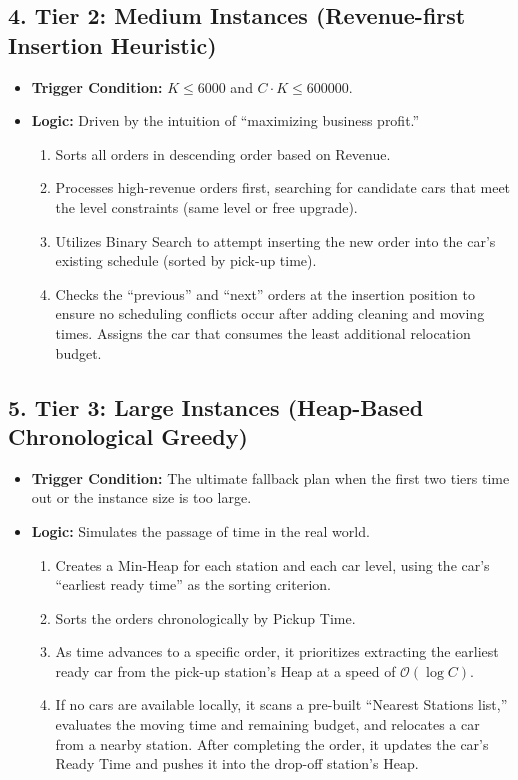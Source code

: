 \documentclass[12pt,a4paper]{article}
\begin{document}
\subsection*{4. Tier 2: Medium Instances (Revenue-first Insertion Heuristic)}
\begin{itemize}
    \item \textbf{Trigger Condition:} $K \le 6000$ and $C \cdot K \le 600000$.
    \item \textbf{Logic:} Driven by the intuition of ``maximizing business profit.''
    \begin{enumerate}[label=\textbf{\alph*.}]
        \item Sorts all orders in descending order based on Revenue.
        \item Processes high-revenue orders first, searching for candidate cars that meet the level constraints (same level or free upgrade).
        \item Utilizes Binary Search to attempt inserting the new order into the car's existing schedule (sorted by pick-up time).
        \item Checks the ``previous'' and ``next'' orders at the insertion position to ensure no scheduling conflicts occur after adding cleaning and moving times. Assigns the car that consumes the least additional relocation budget.
    \end{enumerate}
\end{itemize}

\subsection*{5. Tier 3: Large Instances (Heap-Based Chronological Greedy)}
\begin{itemize}
    \item \textbf{Trigger Condition:} The ultimate fallback plan when the first two tiers time out or the instance size is too large.
    \item \textbf{Logic:} Simulates the passage of time in the real world.
    \begin{enumerate}[label=\textbf{\alph*.}]
        \item Creates a Min-Heap for each station and each car level, using the car's ``earliest ready time'' as the sorting criterion.
        \item Sorts the orders chronologically by Pickup Time.
        \item As time advances to a specific order, it prioritizes extracting the earliest ready car from the pick-up station's Heap at a speed of $\mathcal{O}(\log C)$.
        \item If no cars are available locally, it scans a pre-built ``Nearest Stations list,'' evaluates the moving time and remaining budget, and relocates a car from a nearby station. After completing the order, it updates the car's Ready Time and pushes it into the drop-off station's Heap.
    \end{enumerate}
\end{itemize}
\end{document}

